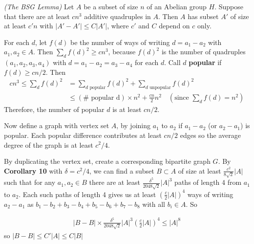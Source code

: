 \documentclass[10pt,a4paper]{report}
\newenvironment{proof}
{\begin{changemargin}{1cm}{0.5cm}
	}%
	{\end{changemargin}
}
\begin{document}
 \emph{(The BSG Lemma)} Let $A$ be a subset of size $n$ of an Abelian group $H$. Suppose that there are at least $cn^3$ additive quadruples in $A$. Then $A$ has subset $A'$ of size at least $c'n$ with $|A'-A'| \leq C|A'|$, where $c'$ and $C$ depend on $c$ only.
\begin{proof}
\pf For each $d$, let $f(d)$ be the number of ways of writing $d = a_1 -a_2$ with $a_1, a_2 \in A$. Then $\sum_d f(d)^2 \geq cn^3$, because $f(d)^2$ is the number of quadruples $(a_1,a_2, a_3, a_4)$ with $d=a_1 - a_2 = a_3 - a_4$ for each $d$. Call $d$ \textbf{popular} if $f(d)\geq cn/2$. Then
\begin{align*}
cn^3 \leq \sum_d f(d)^2 &= \sum_{d \text{ popular}} f(d)^2 + \sum_{d \text{ unpopular}} f(d)^2 \\
&\leq ( \# \text{ popular d}) \times n^2 + \frac{cn}{2} n^2 \quad (\text{since } \sum_d f(d) = n^2)
\end{align*}
Therefore, the number of popular $d$ is at least $cn/2$.

\quad Now define a graph with vertex set $A$, by joining $a_1$ to $a_2$ if $a_1 -a_2$ (or $a_2 -a_1$) is popular. Each popular difference contributes at least $cn/2$ edges so the average degree of the graph is at least $c^2/4$.

\quad By duplicating the vertex set, create a corresponding bipartite graph $G$. By \textbf{Corollary 10} with $\delta = c^2/4$, we can find a subset $B\subset A$ of size at least $\frac{c^2}{8\sqrt{2}} |A|$ such that for any $a_1,a_2 \in B$ there are at least $\frac{\delta^5}{2048\sqrt{2}} |A|^3$ paths of length 4 from $a_1$ to $a_2$. Each such paths of length 4 gives us at least $(\frac{c}{2}|A|)^4$ ways of writing $a_2 -a_1$ as $b_1 -b_2 + b_3 -b_4 +b_5 -b_6 +b_7 -b_8$ with all $b_i \in A$. So

\begin{align*}
|B-B| \times \frac{\delta^5}{2048 \sqrt{2}} |A|^3 (\frac{c}{2}|A|)^4 \leq |A|^8
\end{align*}
so $|B-B|\leq C'|A| \leq C|B|$

\eop
\end{proof}
\end{document}
